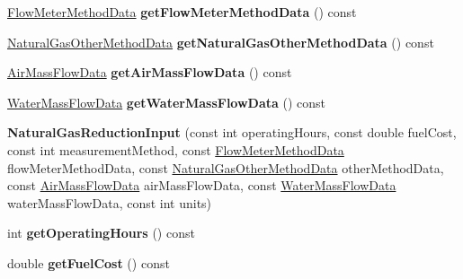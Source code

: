 \begin{DoxyCompactItemize}
\hyperlink{class_flow_meter_method_data}{Flow\+Meter\+Method\+Data} {\bfseries get\+Flow\+Meter\+Method\+Data} () const
\item 
\mbox{\label{class_natural_gas_reduction_input_a09e0822339309acc767a1877f6bc9b74}} 
\hyperlink{class_natural_gas_other_method_data}{Natural\+Gas\+Other\+Method\+Data} {\bfseries get\+Natural\+Gas\+Other\+Method\+Data} () const
\item 
\mbox{\label{class_natural_gas_reduction_input_ab39430a5c9662d3f50c34ec58fdeab59}} 
\hyperlink{class_air_mass_flow_data}{Air\+Mass\+Flow\+Data} {\bfseries get\+Air\+Mass\+Flow\+Data} () const
\item 
\mbox{\label{class_natural_gas_reduction_input_aefc4121d546c3e26e702008868a2f4a3}} 
\hyperlink{class_water_mass_flow_data}{Water\+Mass\+Flow\+Data} {\bfseries get\+Water\+Mass\+Flow\+Data} () const
\item 
\mbox{\label{class_natural_gas_reduction_input_a7595cc335adbd9b2f4965df0bc487fb2}} 
{\bfseries Natural\+Gas\+Reduction\+Input} (const int operating\+Hours, const double fuel\+Cost, const int measurement\+Method, const \hyperlink{class_flow_meter_method_data}{Flow\+Meter\+Method\+Data} flow\+Meter\+Method\+Data, const \hyperlink{class_natural_gas_other_method_data}{Natural\+Gas\+Other\+Method\+Data} other\+Method\+Data, const \hyperlink{class_air_mass_flow_data}{Air\+Mass\+Flow\+Data} air\+Mass\+Flow\+Data, const \hyperlink{class_water_mass_flow_data}{Water\+Mass\+Flow\+Data} water\+Mass\+Flow\+Data, const int units)
\item 
\mbox{\label{class_natural_gas_reduction_input_a2c73074bd0a2d80c7006f2a3d48f0478}} 
int {\bfseries get\+Operating\+Hours} () const
\item 
\mbox{\label{class_natural_gas_reduction_input_a3a7d17dcb66d4f7c585e79e6bc4ea15a}} 
double {\bfseries get\+Fuel\+Cost} () const
\item 
\mbox{\label{class_natural_gas_reduction_input_addeaed7fa85f47fbb1249ed5b11c3c61}} 

\end{DoxyCompactItemize}
